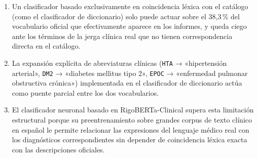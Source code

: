 \begin{enumerate}
 \item Un clasificador basado exclusivamente en coincidencia léxica con el catálogo (como el clasificador de diccionario) solo puede actuar sobre el 38,3\,\% del vocabulario oficial que efectivamente aparece en los informes, y queda ciego ante los términos de la jerga clínica real que no tienen correspondencia directa en el catálogo.
 \item La expansión explícita de abreviaturas clínicas (\texttt{HTA} → «hipertensión arterial», \texttt{DM2} → «diabetes mellitus tipo 2», \texttt{EPOC} → «enfermedad pulmonar obstructiva crónica») implementada en el clasificador de diccionario actúa como puente parcial entre los dos vocabularios.
 \item El clasificador neuronal basado en RigoBERTa-Clinical supera esta limitación estructural porque su preentrenamiento sobre grandes corpus de texto clínico en español le permite relacionar las expresiones del lenguaje médico real con los diagnósticos correspondientes sin depender de coincidencia léxica exacta con las descripciones oficiales.
\end{enumerate}
